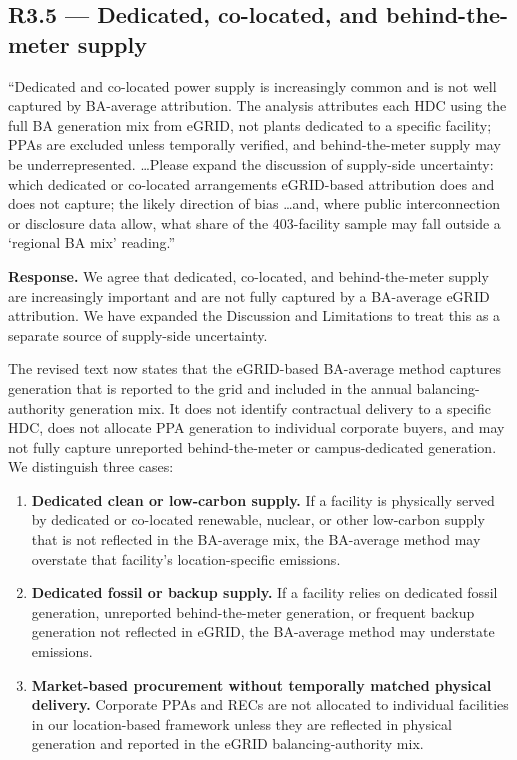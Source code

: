 \documentclass[11pt]{article}
\newenvironment{revquote}{%
  \begin{mdframed}[
    leftmargin=0.5em,
    rightmargin=0.5em,
    linewidth=0pt,
    backgroundcolor=gray!8,
    skipabove=0.5em,
    skipbelow=0.5em,
    innertopmargin=0.6em,
    innerbottommargin=0.6em,
    innerleftmargin=0.8em,
    innerrightmargin=0.8em
  ]%
  \itshape%
}{%
  \end{mdframed}%
}
\begin{document}
\subsection*{R3.5 --- Dedicated, co-located, and behind-the-meter supply}

\begin{revquote}
``Dedicated and co-located power supply is increasingly common and is not well captured by BA-average attribution. The analysis attributes each HDC using the full BA generation mix from eGRID, not plants dedicated to a specific facility; PPAs are excluded unless temporally verified, and behind-the-meter supply may be underrepresented. \ldots Please expand the discussion of supply-side uncertainty: which dedicated or co-located arrangements eGRID-based attribution does and does not capture; the likely direction of bias \ldots and, where public interconnection or disclosure data allow, what share of the 403-facility sample may fall outside a `regional BA mix' reading.''
\end{revquote}

\textbf{Response.} We agree that dedicated, co-located, and behind-the-meter supply are increasingly important and are not fully captured by a BA-average eGRID attribution. We have expanded the Discussion and Limitations to treat this as a separate source of supply-side uncertainty.

The revised text now states that the eGRID-based BA-average method captures generation that is reported to the grid and included in the annual balancing-authority generation mix. It does not identify contractual delivery to a specific HDC, does not allocate PPA generation to individual corporate buyers, and may not fully capture unreported behind-the-meter or campus-dedicated generation. We distinguish three cases:

\begin{enumerate}[label=(\roman*)]
    \item \textbf{Dedicated clean or low-carbon supply.} If a facility is physically served by dedicated or co-located renewable, nuclear, or other low-carbon supply that is not reflected in the BA-average mix, the BA-average method may overstate that facility's location-specific emissions.
    \item \textbf{Dedicated fossil or backup supply.} If a facility relies on dedicated fossil generation, unreported behind-the-meter generation, or frequent backup generation not reflected in eGRID, the BA-average method may understate emissions.
    \item \textbf{Market-based procurement without temporally matched physical delivery.} Corporate PPAs and RECs are not allocated to individual facilities in our location-based framework unless they are reflected in physical generation and reported in the eGRID balancing-authority mix.
\end{enumerate}
\end{document}
